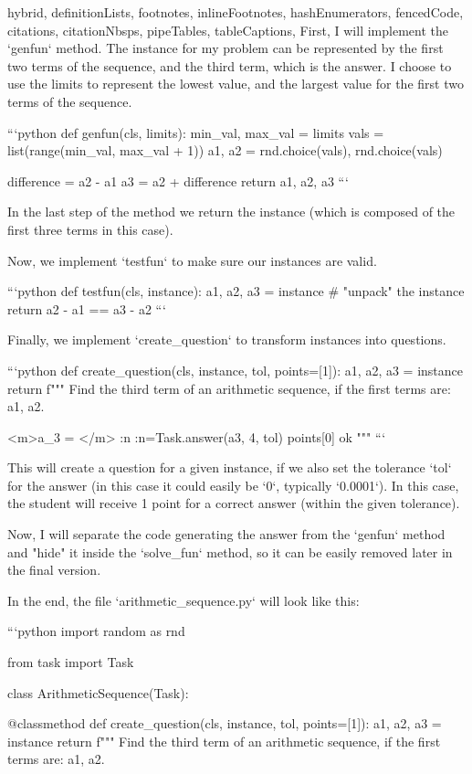 \documentclass[
  digital, %
  table,   %
  twoside, %
  nolof,     %
  nolot,     %
  draft=false,
  final,
]{fithesis3}
\begin{document}
\begin{markdown*}{%
  hybrid,
  definitionLists,
  footnotes,
  inlineFootnotes,
  hashEnumerators,
  fencedCode,
  citations,
  citationNbsps,
  pipeTables,
  tableCaptions,
}
First, I will implement the `genfun` method. The instance for my problem
can be represented by the first two terms of the sequence, and the third
term, which is the answer. I choose to use the limits to represent the lowest
value, and the largest value for the first two terms of the sequence.

```python
def genfun(cls, limits):
    min_val, max_val = limits
    vals = list(range(min_val, max_val + 1))
    a1, a2 = rnd.choice(vals), rnd.choice(vals)

    difference = a2 - a1
    a3 = a2 + difference
    return a1, a2, a3
```

In the last step of the method we return the instance (which is composed of the
first three terms in this case).

Now, we implement `testfun` to make sure our instances are valid.

```python
def testfun(cls, instance):
    a1, a2, a3 = instance  # "unpack" the instance
    return a2 - a1 == a3 - a2
```

Finally, we implement `create_question` to transform instances
into questions.

```python
def create_question(cls, instance, tol, points=[1]):
    a1, a2, a3 = instance
    return f"""
    Find the third term of an arithmetic sequence, if the first terms 
    are: {a1}, {a2}. 
    
    <m>a_3 = </m> :n
    :n={Task.answer(a3, 4, tol)} {points[0]} ok
    """
```

This will create a question for a given instance, if we also set the
tolerance `tol` for the answer (in this case it could easily be `0`, typically `0.0001`).
In this case, the student will receive 1 point for a correct answer (within the given tolerance).

Now, I will separate the code generating the answer from the `genfun` method and
"hide" it inside the `solve_fun` method, so it can be easily removed later in the final version.

In the end, the file `arithmetic_sequence.py` will look like this:

```python
import random as rnd

from task import Task

class ArithmeticSequence(Task):

    @classmethod
    def create_question(cls, instance, tol, points=[1]):
        a1, a2, a3 = instance
        return f"""
        Find the third term of an arithmetic sequence, if the first terms 
        are: {a1}, {a2}. 
        

\end{markdown*}
\end{document}
